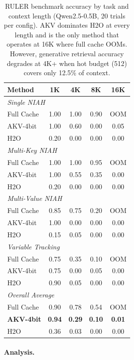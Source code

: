 \documentclass[11pt,a4paper]{article}
\begin{document}
\begin{table}[h]
\centering
\begin{tabular}{lcccc}
\toprule
\textbf{Method} & \textbf{1K} & \textbf{4K} & \textbf{8K} & \textbf{16K} \\
\midrule
\multicolumn{5}{l}{\textit{Single NIAH}} \\
Full Cache & 1.00 & 1.00 & 0.90 & OOM \\
AKV-4bit & 1.00 & 0.60 & 0.00 & 0.05 \\
H2O & 0.20 & 0.00 & 0.00 & 0.00 \\
\midrule
\multicolumn{5}{l}{\textit{Multi-Key NIAH}} \\
Full Cache & 1.00 & 1.00 & 0.95 & OOM \\
AKV-4bit & 1.00 & 0.55 & 0.35 & 0.00 \\
H2O & 0.20 & 0.00 & 0.00 & 0.00 \\
\midrule
\multicolumn{5}{l}{\textit{Multi-Value NIAH}} \\
Full Cache & 0.85 & 0.75 & 0.20 & OOM \\
AKV-4bit & 1.00 & 0.00 & 0.00 & 0.00 \\
H2O & 0.15 & 0.05 & 0.00 & 0.00 \\
\midrule
\multicolumn{5}{l}{\textit{Variable Tracking}} \\
Full Cache & 0.75 & 0.35 & 0.10 & OOM \\
AKV-4bit & 0.75 & 0.00 & 0.05 & 0.00 \\
H2O & 0.90 & 0.05 & 0.00 & 0.00 \\
\midrule
\multicolumn{5}{l}{\textit{Overall Average}} \\
Full Cache & 0.90 & 0.78 & 0.54 & OOM \\
\textbf{AKV-4bit} & \textbf{0.94} & \textbf{0.29} & \textbf{0.10} & \textbf{0.01} \\
H2O & 0.36 & 0.03 & 0.00 & 0.00 \\
\bottomrule
\end{tabular}
\caption{RULER benchmark accuracy by task and context length (Qwen2.5-0.5B, 20 trials per config). AKV dominates H2O at every length and is the only method that operates at 16K where full cache OOMs. However, generative retrieval accuracy degrades at 4K+ when hot budget (512) covers only 12.5\% of context.}
\label{tab:ruler}
\end{table}

\paragraph{Analysis.}
\end{document}
